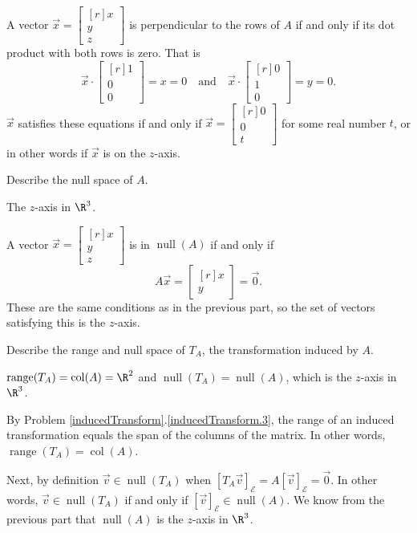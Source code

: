 \documentclass{problemset}
\DeclareMathOperator{\Range}{range}
\DeclareMathOperator{\Null}{null}
\DeclareMathOperator{\Col}{col}
\newcommand{\mat}[1]{\begin{bmatrix*}[r]#1\end{bmatrix*}}
\begin{document}
\begin{parts}
\begin{solution}
				A vector $\vec x=\mat{x\\y\\z}$ is perpendicular to the rows of $A$
				if and only if its dot product with both rows is zero. That is
				\[
					\vec x\cdot\mat{1\\0\\0} = x = 0
					\quad \text{and} \quad
					\vec x\cdot\mat{0\\1\\0} = y = 0.
				\]
				$\vec x$ satisfies these equations if and only if $\vec x=\mat{0\\0\\t}$
				for some real number $t$, or in other words if $\vec x$ is on the
				$z$-axis. 
			\end{solution}
		\item Describe the null space of $A$.
			\begin{solution}
				The $z$-axis in $\R^3$. 

				A vector $\vec x=\mat{x\\y\\z}$ is in $\Null(A)$ if
				and only if
				\[
					A\vec x = \mat{x\\y} = \vec 0.
				\]
				These are the same conditions as in the previous part, so the set
				of vectors satisfying this is the $z$-axis.	
			\end{solution}
		\item Describe the range and null space of $T_A$, the transformation
			induced by $A$.
			\label{fundamentalSubspaces.6}
			\begin{solution}
				$\Range(T_A)=\Col(A)=\R^2$ and $\Null(T_A)=\Null(A)$, 
				which is the $z$-axis in $\R^3$. 

				By Problem \ref{inducedTransform}.\ref{inducedTransform.3}, the
				range of an induced transformation equals the span of the columns
				of the matrix. In other words, $\Range(T_A)=\Col(A)$. 

				Next, by definition $\vec v\in\Null(T_A)$ when 
				$[T_A\vec v]_{\mathcal E}=A[\vec v]_{\mathcal E}=\vec 0$.
				In other words, $\vec v\in\Null(T_A)$ if and only if 
				$[\vec v]_{\mathcal E}\in\Null(A)$. We know from the previous
				part that $\Null(A)$ is the $z$-axis in $\R^3$. 
			\end{solution}
	\end{parts}
\end{document}
